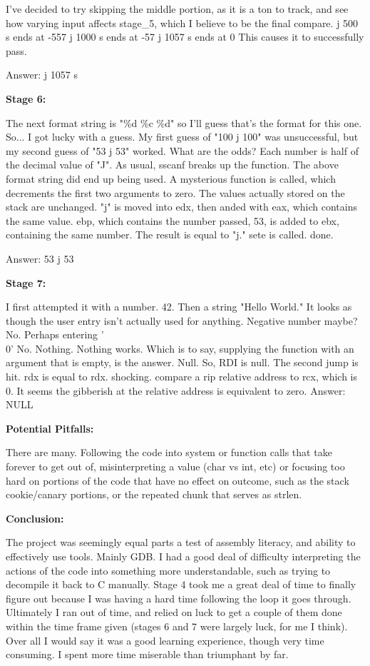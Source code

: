 \documentclass{article}
\begin{document}
    I've decided to try skipping the middle portion, as it is a ton to track, and see how varying input affects stage\_5, which I believe to be the final compare.
    j 500 s ends at -557
    j 1000 s ends at -57
    j 1057 s ends at 0
    This causes it to successfully pass.

    Answer: j 1057 s


    \textbf{Stage 6:}

    \bigskip

    The next format string is "\%d \%c \%d" so I'll guess that's the format for this one.
    So... I got lucky with a guess.
    My first guess of "100 j 100" was unsuccessful, but my second guess of "53 j 53" worked. What are the odds?
    Each number is half of the decimal value of "J".
    As usual, sscanf breaks up the function. The above format string did end up being used.
    A mysterious function is called, which decrements the first two arguments to zero. The values actually stored on the stack are unchanged.
    "j" is moved into edx, then anded with eax, which contains the same value.
    ebp, which contains the number passed, 53, is added to ebx, containing the same number. The result is equal to "j." 
    sete is called.
    done.

    Answer: 53 j 53

    \bigskip

    \textbf{Stage 7:}

    \bigskip

        I first attempted it with a number. 42. Then a string "Hello World."
It looks as though the user entry isn't actually used for anything.
Negative number maybe? No.
Perhaps entering '\\0' No.
Nothing. Nothing works. Which is to say, supplying the function with an argument that is empty, is the answer. Null.
So, RDI is null.
The second jump is hit. rdx is equal to rdx. shocking.
compare a rip relative address to rcx, which is 0.
It seems the gibberish at the relative address is equivalent to zero.
Answer: NULL

    \bigskip


    \textbf{Potential Pitfalls:}

    There are many. Following the code into system or function calls that take forever to get out of, misinterpreting a value (char vs int, etc) or focusing too hard on portions of the code that have no effect on outcome, such as the stack cookie/canary portions, or the repeated chunk that serves as strlen.


    \textbf{Conclusion:}

    The project was seemingly equal parts a test of assembly literacy, and ability to effectively use tools. Mainly GDB. I had a good deal of difficulty interpreting the actions of the code into something more understandable, such as trying to decompile it back to C manually. Stage 4 took me a great deal of time to finally figure out because I was having a hard time following the loop it goes through. Ultimately I ran out of time, and relied on luck to get a couple of them done within the time frame given (stages 6 and 7 were largely luck, for me I think).
    Over all I would say it was a good learning experience, though very time consuming. I spent more time miserable than triumphant by far.
\end{document}
